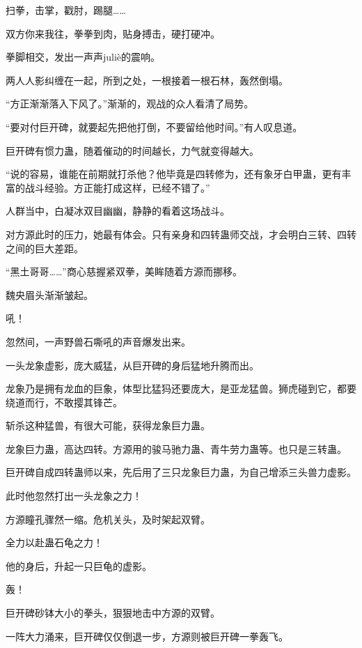 
\begin{this_body}

扫拳，击掌，戳肘，踢腿……

双方你来我往，拳拳到肉，贴身搏击，硬打硬冲。

拳脚相交，发出一声声juliè的震响。

两人人影纠缠在一起，所到之处，一根接着一根石林，轰然倒塌。

“方正渐渐落入下风了。”渐渐的，观战的众人看清了局势。

“要对付巨开碑，就要起先把他打倒，不要留给他时间。”有人叹息道。

巨开碑有惯力蛊，随着催动的时间越长，力气就变得越大。

“说的容易，谁能在前期就打杀他？他毕竟是四转修为，还有象牙白甲蛊，更有丰富的战斗经验。方正能打成这样，已经不错了。”

人群当中，白凝冰双目幽幽，静静的看着这场战斗。

对方源此时的压力，她最有体会。只有亲身和四转蛊师交战，才会明白三转、四转之间的巨大差距。

“黑土哥哥……”商心慈握紧双拳，美眸随着方源而挪移。

魏央眉头渐渐皱起。

吼！

忽然间，一声野兽石嘶吼的声音爆发出来。

一头龙象虚影，庞大威猛，从巨开碑的身后猛地升腾而出。

龙象乃是拥有龙血的巨象，体型比猛犸还要庞大，是亚龙猛兽。狮虎碰到它，都要绕道而行，不敢撄其锋芒。

斩杀这种猛兽，有很大可能，获得龙象巨力蛊。

龙象巨力蛊，高达四转。方源用的骏马驰力蛊、青牛劳力蛊等。也只是三转蛊。

巨开碑自成四转蛊师以来，先后用了三只龙象巨力蛊，为自己增添三头兽力虚影。

此时他忽然打出一头龙象之力！

方源瞳孔骤然一缩。危机关头，及时架起双臂。

全力以赴蛊石龟之力！

他的身后，升起一只巨龟的虚影。

轰！

巨开碑砂钵大小的拳头，狠狠地击中方源的双臂。

一阵大力涌来，巨开碑仅仅倒退一步，方源则被巨开碑一拳轰飞。


\end{this_body}
